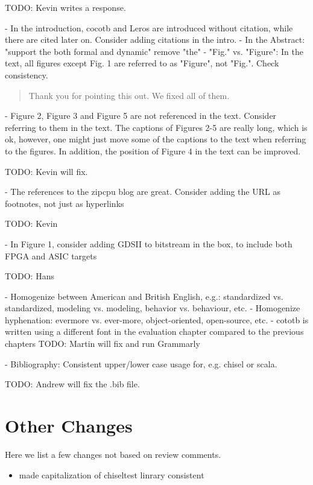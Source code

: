 \documentclass{article}
\newcommand{\todo}[1]{{\color{olive} TODO: #1}}
\newcommand{\reply}[1]{{\color{blue} #1}}
\begin{document}
\todo{Kevin writes a response.}

- In the introduction, cocotb and Leros are introduced without citation, while there are cited later on. Consider adding citations in the intro.
- In the Abstract: "support the both formal and dynamic" remove "the"
- "Fig." vs. "Figure": In the text, all figures except Fig. 1 are referred to as "Figure", not "Fig.". Check consistency.

\begin{quote}
\reply{Thank you for pointing this out. We fixed all of them.}
\end{quote}

- Figure 2, Figure 3 and Figure 5 are not referenced in the text. Consider referring to them in the text. The captions of Figures 2-5 are really long, which is ok, however, one might just move some of the captions to the text when referring to the figures. In addition, the position of Figure 4 in the text can be improved. 

\todo{Kevin will fix.}

- The references to the zipcpu blog are great. Consider adding the URL as footnotes, not just as hyperlinks

\todo{Kevin}

- In Figure 1, consider adding GDSII to bitstream in the box, to include both FPGA and ASIC targets

\todo{Hans}

- Homogenize between American and British English, e.g.: standardized vs. standardized, modeling vs. modeling, behavior vs. behaviour, etc.
- Homogenize hyphenation: evermore vs. ever-more, object-oriented, open-source, etc.
- cototb is written using a different font in the evaluation chapter compared to the previous chapters
\todo{Martin will fix and run Grammarly}

- Bibliography: Consistent upper/lower case usage for, e.g. chisel or scala.

\todo{Andrew will fix the .bib file.}




\section*{Other Changes}

Here we list a few changes not based on review comments.

\begin{itemize}
	\item  made capitalization of chiseltest linrary consistent
\end{itemize}
\end{document}
